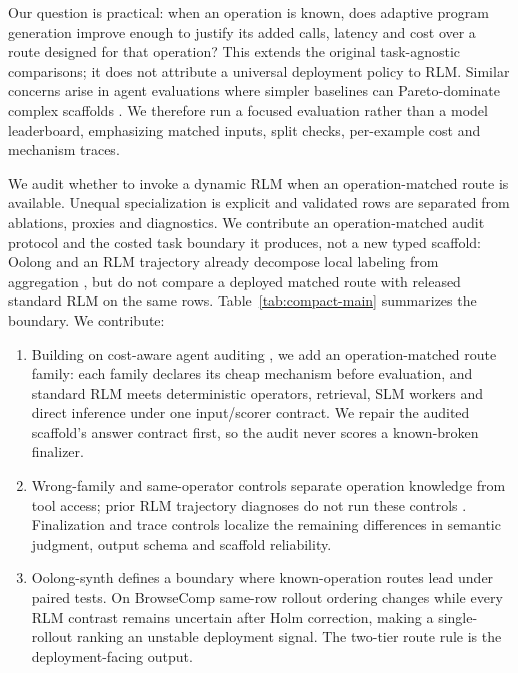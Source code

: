 \documentclass[letterpaper]{article}
\begin{document}
Our question is practical: when an operation is known, does adaptive program generation improve enough to justify its added calls, latency and cost over a route designed for that operation? This extends the original task-agnostic comparisons; it does not attribute a universal deployment policy to RLM. Similar concerns arise in agent evaluations where simpler baselines can Pareto-dominate complex scaffolds \citep{kapoor2024agentsmatter,yehudai2026agenteval,chen2025scienceagentbench,bragg2026astabench}. We therefore run a focused evaluation rather than a model leaderboard, emphasizing matched inputs, split checks, per-example cost and mechanism traces.

We audit whether to invoke a dynamic RLM when an operation-matched route is available. Unequal specialization is explicit and validated rows are separated from ablations, proxies and diagnostics. We contribute an operation-matched audit protocol and the costed task boundary it produces, not a new typed scaffold: Oolong and an RLM trajectory already decompose local labeling from aggregation \citep[App.~E.2]{zhang2025rlm}, but do not compare a deployed matched route with released standard RLM on the same rows. Table~\ref{tab:compact-main} summarizes the boundary. We contribute:
\begin{enumerate}
    \item Building on cost-aware agent auditing \citep{kapoor2024agentsmatter}, we add an operation-matched route family: each family declares its cheap mechanism before evaluation, and standard RLM meets deterministic operators, retrieval, SLM workers and direct inference under one input/scorer contract. We repair the audited scaffold's answer contract first, so the audit never scores a known-broken finalizer.
    \item Wrong-family and same-operator controls separate operation knowledge from tool access; prior RLM trajectory diagnoses do not run these controls \citep{zhang2025rlm,wang2026thinkdontoverthink}. Finalization and trace controls localize the remaining differences in semantic judgment, output schema and scaffold reliability.
    \item Oolong-synth defines a boundary where known-operation routes lead under paired tests. On BrowseComp same-row rollout ordering changes while every RLM contrast remains uncertain after Holm correction, making a single-rollout ranking an unstable deployment signal. The two-tier route rule is the deployment-facing output.
\end{enumerate}
\end{document}
